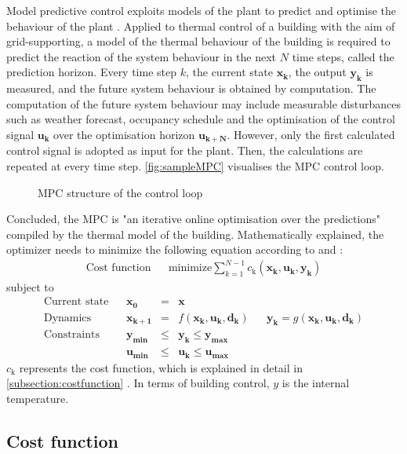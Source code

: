 Model predictive control exploits models of the plant to predict and optimise the behaviour of the plant \cite{Grune.2017}.
Applied to thermal control of a building with the aim of grid-supporting, a model of the thermal behaviour of the building is required to predict the reaction of the system behaviour in the next $N$ time steps, called the prediction horizon. Every time step $k$, the current state $\mathbf{x_k}$, the output $\mathbf{y_k}$ is measured, and the future system behaviour is obtained by computation. The computation of the future system behaviour may include measurable disturbances such as weather forecast, occupancy schedule and the optimisation of the control signal $\mathbf{u_k}$ over the optimisation horizon $\mathbf{u_{k+N}}$. However, only the first calculated control signal is adopted as input for the plant.
Then, the calculations are repeated at every time step. \autoref{fig:sampleMPC} visualises the MPC control loop.
 \begin{figure}[h]
    \centering
   \def\svgwidth{320pt}
    
    \caption{MPC structure of the control loop}
    \label{fig:sampleMPC}
    \end{figure}
\newline
Concluded, the MPC is "an iterative online optimisation over the predictions"
\cite{Grune.2017} 
compiled by the thermal model of the building. Mathematically explained, the optimizer needs to minimize the following equation according to
\cite{Kouvaritakis.2018}
and
\cite{Oldewurtel.2012}:
\begin{align}
\label{eq:costfunc}
\textrm{Cost function} && \text{minimize} \sum_{k=1}^{N-1} c_\text{k}(\mathbf{x_k,u_k,y_k})
\end{align}
subject to 
\begin{align*}
\textrm{Current state} && \mathbf{x_0} &=& \mathbf{x} \\	
\textrm{Dynamics} && \mathbf{x_{k+1}}&=& f(\mathbf{x_k,u_k,d_k})		&&	\mathbf{y_k} = g(\mathbf{x_k,u_k,d_k})\\				
\textrm{Constraints} && \mathbf{y_{min}}&\leq& \mathbf{y_k} \leq \mathbf{y_{max}}\\		
\textrm{} && \mathbf{u_{min}}&\leq& \mathbf{u_k} \leq \mathbf{u_{max}}	
\end{align*}
$c_\text{k}$ represents the cost function, which is explained in detail in \autoref{subsection:costfunction}
. In terms of building control, $y$ is the internal temperature.

\subsection{Cost function}
\label{subsection:costfunction}

